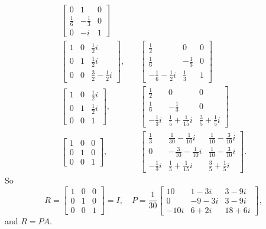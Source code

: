\begin{solution}
\begin{align*}
\begin{bmatrix}
      0 & 1 & 0 \\[3pt]
      \frac16 & -\frac13 & 0 \\[3pt]
      0 & -i & 1
    \end{bmatrix} \\
    \begin{bmatrix}
      1 & 0 & \frac12i \\[3pt]
      0 & 1 & \frac12i \\[3pt]
      0 & 0 & \frac32 - \frac12i
    \end{bmatrix},
    &\quad
    \begin{bmatrix}
      \frac12 & 0 & 0 \\[3pt]
      \frac16 & -\frac13 & 0 \\[3pt]
      -\frac16 - \frac12i & \frac13 & 1
    \end{bmatrix} \\
    \begin{bmatrix}
      1 & 0 & \frac12i \\[3pt]
      0 & 1 & \frac12i \\[3pt]
      0 & 0 & 1
    \end{bmatrix},
    &\quad
    \begin{bmatrix}
      \frac12 & 0 & 0 \\[3pt]
      \frac16 & -\frac13 & 0 \\[3pt]
      -\frac13i & \frac15 + \frac1{15}i & \frac35 + \frac15i
    \end{bmatrix} \\
    \begin{bmatrix}
      1 & 0 & 0 \\[3pt]
      0 & 1 & 0 \\[3pt]
      0 & 0 & 1
    \end{bmatrix},
    &\quad
    \begin{bmatrix}
      \frac13 & \frac1{30}-\frac1{10}i & \frac1{10}-\frac3{10}i \\[3pt]
      0 & -\frac3{10}-\frac1{10}i & \frac1{10} - \frac3{10}i \\[3pt]
      -\frac13i & \frac15 + \frac1{15}i & \frac35 + \frac15i
    \end{bmatrix}.
  \end{align*}
  So
  \begin{equation*}
    R =
    \begin{bmatrix}
      1 & 0 & 0 \\
      0 & 1 & 0 \\
      0 & 0 & 1
    \end{bmatrix}
    = I,
    \quad
    P = \frac1{30}
    \begin{bmatrix}
      10 & 1 - 3i & 3 - 9i \\
      0 & -9 - 3i & 3 - 9i \\
      -10i & 6 + 2i & 18 + 6i
    \end{bmatrix},
  \end{equation*}
  and $R = PA$.
\end{solution}

